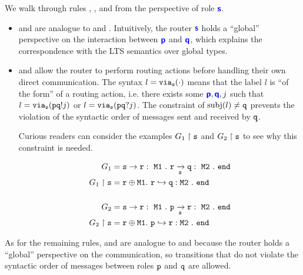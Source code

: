We walk through rules , ,
 and 
from the perspective of role $\role{s}$.

\begin{itemize}

\item {} and  are
analogue to  and .
Intuitively, the router $\role{s}$ holds a
``global'' perspective on the interaction
between $\role{p}$ and $\role{q}$, which explains
the correspondence with the LTS semantics over global
types.

\item {} and  allow
the router to perform routing actions before handling
their own direct communication. The syntax $l = \via{s}{\cdot}$
means that the label $l$ is ``of the form'' of a routing
action, i.e. there exists some $\role{p}, \role{q}, j$
such that $l = \via{s}{\aout{p}{q}{j}}$ or 
$l = \via{s}{\ain{p}{q}{j}}$.
The constraint of $\subj{l} \neq \mrole{q}$
prevents the violation of the syntactic order of messages
sent and received by $\mrole{q}$.

Curious readers can consider the examples 
$\proj{G_1}{s}$ and $\proj{G_2}{s}$
to see why this constraint is needed.

\begin{align*}
G_1 &= \gcommone{s}{r}{\tmsg{M1}}.~ \grouteone{r}{q}{s}{\tmsg{M2}}.~ \tend \\
\proj{G_1}{s} &= \tselone{r}{\tmsg{M1}}. ~ 
	\routerone{r}{q}{\tmsg{M2}}{\tend} \\~\\
G_2 &= \gcommone{s}{r}{\tmsg{M1}}.~ \grouteone{p}{r}{s}{\tmsg{M2}}.~ \tend \\
\proj{G_2}{s} &= \tselone{r}{\tmsg{M1}}. ~ 
	\routerone{p}{r}{\tmsg{M2}}{\tend} \\
\end{align*}

\end{itemize}

As for the remaining rules,
 and  are analogue to
 and  because the router
holds a ``global'' perspective on the communication,
so transitions that do not violate the syntactic order
of messages between roles $\mrole{p}$ and $\mrole{q}$
are allowed.

